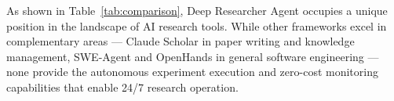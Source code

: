 As shown in Table~\ref{tab:comparison}, Deep Researcher Agent occupies a unique position in the landscape of AI research tools. While other frameworks excel in complementary areas --- Claude Scholar in paper writing and knowledge management, SWE-Agent and OpenHands in general software engineering --- none provide the autonomous experiment execution and zero-cost monitoring capabilities that enable 24/7 research operation.
